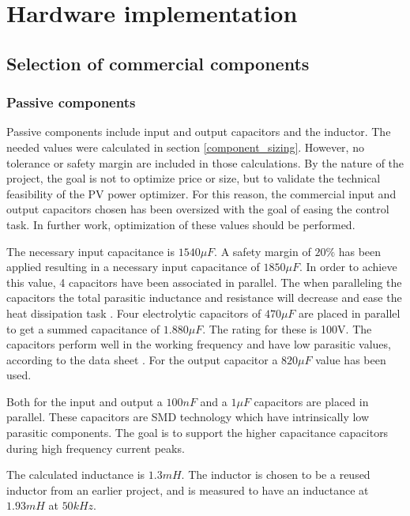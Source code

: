 
\chapter{Hardware implementation} \label{ch:hardware_implementation}


\section{Selection of commercial components}

\subsection{Passive components}

Passive components include input and output capacitors and the inductor. The needed values were calculated in section \ref{component_sizing}. However, no tolerance or safety margin are included in those calculations. By the nature of the project, the goal is not to optimize price or size, but to validate the technical feasibility of the PV power optimizer. For this reason, the commercial input and output capacitors chosen has been oversized with the goal of easing the control task. In further work, optimization of these values should be performed.

The necessary input capacitance is $1540 \mu F$. A safety margin of $20 \%$ has been applied resulting in a necessary input capacitance of $1850 \mu F$. In order to achieve this value, 4 capacitors have been associated in parallel. The when paralleling the capacitors the total parasitic inductance and resistance will decrease and ease the heat dissipation task \cite{capacitor_paracitics}. Four electrolytic capacitors of $470\mu F$ \cite{cin} are placed in parallel to get a summed capacitance of $1.880\mu F$. The rating for these is 100V. The capacitors perform well in the working frequency and have low parasitic values, according to the data sheet \cite{cin}. For the output capacitor a $820\mu F$ value has been used\cite{cout}. 

Both for the input and output a $100nF$ and a $1\mu F$ capacitors are placed in parallel. These capacitors are SMD technology which have intrinsically low parasitic components. The goal is to support the higher capacitance capacitors during high frequency current peaks\cite{paracitics_stuff}.

The calculated inductance is $1.3 mH$. The inductor is chosen to be a reused inductor from an earlier project, and is measured to have an inductance at $1.93mH$ at $50kHz$. 

